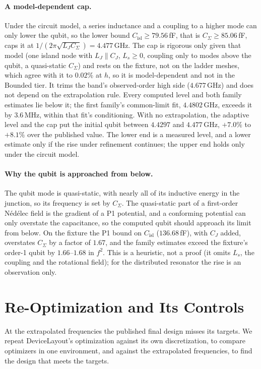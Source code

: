 \documentclass{anvil-paper}
\newcommand{\Cisl}{C_{\mathrm{isl}}}
\begin{document}
\paragraph{A model-dependent cap.}
Under the circuit model, a series inductance and a coupling to a higher
mode can only lower the qubit, so the lower bound $\Cisl \ge 79.56$\,fF,
that is $C_\Sigma \ge 85.06$\,fF, caps it at $1/(2\pi\sqrt{L_J C_\Sigma})
= 4.477$\,GHz. The cap is rigorous only given that model (one island node
with $L_J \parallel C_J$, $L_s \ge 0$, coupling only to modes above the
qubit, a quasi-static $C_\Sigma$) and rests on the fixture, not on the
ladder meshes, which agree with it to $0.02\%$ at $h$, so it is
model-dependent and not in the Bounded tier. It trims the band's observed-order high side ($4.677$\,GHz)
and does not depend on the extrapolation rule. Every computed level and both family
estimates lie below it; the first family's common-limit fit, $4.4802$\,GHz,
exceeds it by $3.6$\,MHz, within that fit's conditioning. With no
extrapolation, the adaptive level and the cap put the initial qubit between
$4.4297$ and $4.477$\,GHz, $+7.0\%$ to $+8.1\%$ over the published value.
The lower end is a measured level, and a lower estimate only if the rise
under refinement continues; the upper end holds only under the circuit
model.

\paragraph{Why the qubit is approached from below.}
The qubit mode is quasi-static, with nearly all of its inductive energy in
the junction, so its frequency is set by $C_\Sigma$. The quasi-static part
of a first-order N\'ed\'elec field is the gradient of a P1 potential, and a
conforming potential can only overstate the capacitance, so the computed
qubit should approach its limit from below. On the fixture the P1 bound on
$\Cisl$ ($136.68$\,fF), with $C_J$ added, overstates $C_\Sigma$ by a factor
of $1.67$, and the family estimates exceed the fixture's order-1 qubit by
$1.66$--$1.68$ in $f^2$. This is a heuristic, not a proof (it omits $L_s$,
the coupling and the rotational field); for the distributed resonator the
rise is an observation only.

\section{Re-Optimization and Its Controls}
\label{sec:reopt}

At the extrapolated frequencies the published final design misses its
targets. We repeat DeviceLayout's optimization against its own
discretization, to compare optimizers in one environment, and against the
extrapolated frequencies, to find the design that meets the targets.
\end{document}

